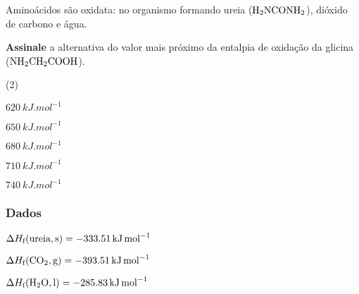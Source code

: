 \documentclass[braun, twocolumn]{braun}
\begin{document}
\begin{problem}
[2A16]Aminoácidos são oxidata: no organismo formando ureia
(\(\ce{H2NCONH2}\)), dióxido de carbono e água.

\textbf{Assinale} a alternativa do valor mais próximo da entalpia de
oxidação da glicina (\(\ce{NH2CH2COOH}\)).


\begin{choices}
(2)
\item \(\qty{620}{kJ.mol^{-1}}\)

\item \(\qty{650}{kJ.mol^{-1}}\)

\item \(\qty{680}{kJ.mol^{-1}}\)

\item \(\qty{710}{kJ.mol^{-1}}\)

\item \(\qty{740}{kJ.mol^{-1}}\)

\end{choices}
\subsubsection*{Dados}


\begin{datalist}

\item $\Delta H_\text{f}(\ce{ureia, {s}}) = \qty{-333,51}{kJ.mol^{-1}}$
\item $\Delta H_\text{f}(\ce{CO2, {g}}) = \qty{-393,51}{kJ.mol^{-1}}$
\item $\Delta H_\text{f}(\ce{H2O, {l}}) = \qty{-285,83}{kJ.mol^{-1}}$
\end{datalist}

\end{problem}
\end{document}
